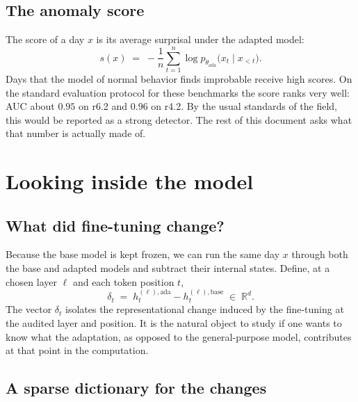 \documentclass[10pt]{article}
\begin{document}
\subsection{The anomaly score}

The score of a day $x$ is its average surprisal under the adapted
model:
\begin{equation}
s(x) \;=\; -\frac{1}{n}\sum_{t=1}^{n} \log
p_{\theta_{\mathrm{ada}}}\bigl(x_t \mid x_{<t}\bigr).
\end{equation}
Days that the model of normal behavior finds improbable receive high
scores. On the standard evaluation protocol for these benchmarks the
score ranks very well: AUC about $0.95$ on r6.2 and $0.96$ on r4.2. By
the usual standards of the field, this would be reported as a strong
detector. The rest of this document asks what that number is actually
made of.

\section{Looking inside the model}

\subsection{What did fine-tuning change?}

Because the base model is kept frozen, we can run the same day $x$
through both the base and adapted models and subtract their internal
states. Define, at a chosen layer $\ell$ and each token position $t$,
\begin{equation}
\delta_t \;=\; h^{(\ell), \mathrm{ada}}_t - h^{(\ell),
\mathrm{base}}_t \;\in\; \mathbb{R}^{d}.
\end{equation}
The vector $\delta_t$ isolates the representational change induced by
the fine-tuning at the audited layer and position. It is the natural
object to study if one wants to know what the adaptation, as opposed to
the general-purpose model, contributes at that point in the
computation.

\subsection{A sparse dictionary for the changes}
\end{document}
